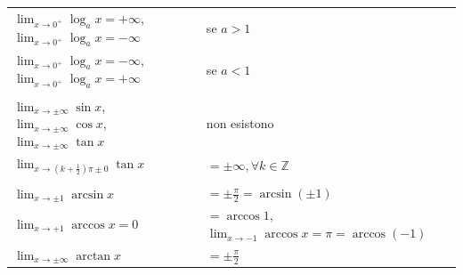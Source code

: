 \documentclass{book}
\begin{document}
\begin{minipage}{\textwidth}
\begin{proposition}
\begin{center}
\begin{tabular}{l l}
                \\
                $\displaystyle \lim_{x \to 0^+} \log_a x = +\infty$, $\displaystyle \lim_{x \to 0^+} \log_a x = -\infty$                                    & se $a > 1$                                                                    \\
                $\displaystyle \lim_{x \to 0^+} \log_a x = -\infty$, $\displaystyle \lim_{x \to 0^+} \log_a x = +\infty$                                    & se $a < 1$                                                                    \\
                \\
                $\displaystyle \lim_{x \to \pm\infty} \sin x$, $\displaystyle \lim_{x \to \pm\infty} \cos x$, $\displaystyle \lim_{x \to \pm\infty} \tan x$ & non esistono                                                                  \\
                $\displaystyle \lim_{x \to (k + \frac{1}{2})\pi \pm 0} \tan x$                                                                              & $= \pm\infty, \forall k \in \mathbb{Z}$                                       \\
                \\
                $\displaystyle \lim_{x \to \pm 1} \arcsin x$                                                                                                & $= \pm \frac{\pi}{2} = \arcsin(\pm 1)$                                        \\
                $\displaystyle \lim_{x \to +1} \arccos x = 0$                                                                                               & $= \arccos 1$, $\displaystyle \lim_{x \to -1} \arccos x = \pi = \arccos (-1)$ \\
                $\displaystyle \lim_{x \to \pm\infty} \arctan x$                                                                                            & $= \pm \frac{\pi}{2}$                                                         \\
            \end{tabular}
        \end{center}
    \end{proposition}
\end{minipage}
\end{document}
